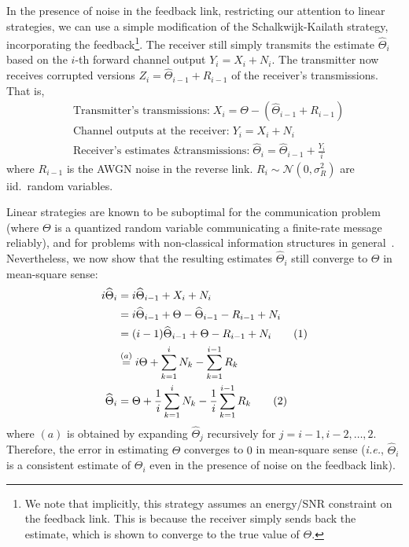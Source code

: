 \documentclass[letterpaper, 10pt, conference]{ieeeconf}
\newcommand\numberthis{\stepcounter{equation}\tag{\theequation}}
\begin{document}
In the presence of noise in the feedback link, restricting our attention to linear strategies, we can use a simple modification of the Schalkwijk-Kailath strategy, incorporating the feedback\footnote{We note that implicitly, this strategy assumes an energy/SNR constraint on the feedback link. This is because the receiver simply sends back the estimate, which is shown to converge to the true value of $\Theta$.}. The receiver still simply transmits the estimate $\widehat{\Theta}_i$ based on the $i$-th forward channel output $Y_i=X_i+N_i$. The transmitter now receives corrupted versions $Z_i=\widehat\Theta_{i-1} + R_{i-1}$ of the receiver's transmissions. That is,
\begin{align}
	& \text{Transmitter's transmissions:}\;X_i = \Theta - (\widehat\Theta_{i-1} + R_{i-1}) \\ \label{eq:noisy-tx-x}
	& \text{Channel outputs at the receiver:}\;	Y_i = X_i + N_i \\
	& \text{Receiver's estimates \& transmissions:}\;	\widehat\Theta_i = \widehat\Theta_{i-1} + \frac{Y_i}{i}
\end{align}
where $R_{i-1}$ is the AWGN noise in the reverse link. $R_i \sim \mathcal{N}(0, \sigma_R^2)$ are iid.\ random variables.

Linear strategies are known to be suboptimal for the communication problem~\cite{YoungHanKimPaper} (where $\Theta$ is a quantized random variable communicating a finite-rate message reliably), and for problems with non-classical information structures in general~\cite{Witsenhausen68}. Nevertheless, we now show that the resulting estimates $\widehat{\Theta}_i$  still converge to $\Theta$ in mean-square sense:
\begin{align*}
	i\widehat\Theta_i &= i\widehat\Theta_{i-1} + X_i + N_i \\
					  &= i\widehat\Theta_{i-1} + \Theta - \widehat\Theta_{i-1} - R_{i-1} + N_i \\
					  &= (i-1) \widehat\Theta_{i-1} + \Theta - R_{i-1} + N_i \numberthis \label{eq:theta_hat_i-noisy-once} \\
					  &\overset{(a)}{=} i\Theta + \sum_{k=1}^i N_k - \sum_{k=1}^{i-1} R_k \\
	\widehat\Theta_i  &= \Theta + \frac{1}{i} \sum_{k=1}^i N_k - \frac{1}{i} \sum_{k=1}^{i-1} R_k \numberthis \label{eq:theta_hat_i-noisy}
\end{align*}
where $(a)$ is obtained by expanding $\widehat{\Theta}_j$ recursively for $j=i-1,i-2,\ldots,2$. Therefore, the error in estimating $\Theta$ converges to $0$ in mean-square sense (\textit{i.e.}, $\widehat{\Theta}_i$ is a consistent estimate of $\Theta_i$ even in the presence of noise on the feedback link).
\end{document}
